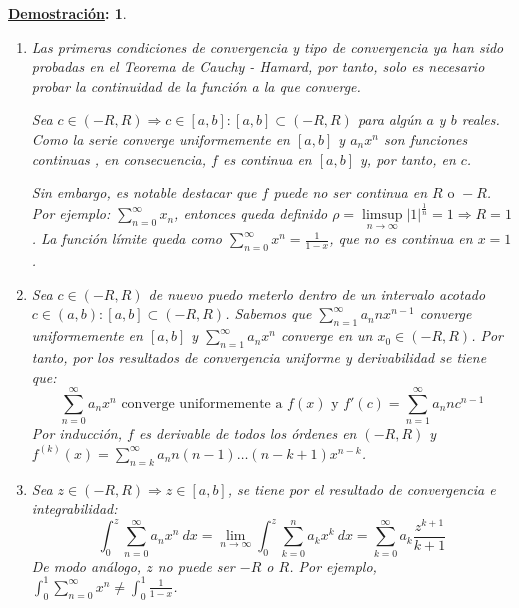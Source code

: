 \documentclass[10pt,a4paper,openright]{book}
\theoremstyle{break}
\newtheorem*{demo}{\underline{Demostración}:}
\newcommand{\dif}[1]{\ d#1}
\begin{document}
\begin{demo}
\begin{enumerate}
\item Las primeras condiciones de convergencia y tipo de convergencia ya han sido probadas en el Teorema de Cauchy - Hamard, por tanto, solo es necesario probar la continuidad de la función a la que converge.

Sea $c \in (-R, R)\Rightarrow c\in [a,b] : [a,b] \subset (-R, R)$ para algún $a$ y $b$ reales. Como la serie converge uniformemente en $[a,b]$ y $a_n x^n$  son funciones continuas , en consecuencia, $f$ es continua en $[a,b]$ y, por tanto, en $c$.

Sin embargo, es notable destacar que $f$ puede no ser continua en $R \mbox{ o } -R$. Por ejemplo: $\sum_{n=0}^{\infty} x_n$, entonces queda definido $\rho = \underset{n \to \infty}\limsup |1|^{\frac{1}{n}} = 1 \Rightarrow R=1$. La función límite queda como $\sum_{n=0}^{\infty} x^n= \frac{1}{1-x}$, que no es continua en $x=1$.

\item Sea $c \in (-R, R)$ de nuevo puedo meterlo dentro de un intervalo acotado $c \in (a,b) : [a,b] \subset (-R, R)$. Sabemos que $\sum_{n=1}^{\infty} a_n n x^{n-1}$ converge uniformemente en $[a,b]$ y $\sum_{n=1}^{\infty} a_n x^n$ converge en un $x_0 \in (-R, R)$. Por tanto, por los resultados de convergencia uniforme y derivabilidad se tiene que:
$$\sum_{n=0}^{\infty} a_n x^n \mbox{ converge uniformemente a } f(x) \mbox{ y } f'(c) = \sum_{n=1}^{\infty} a_n n c^{n-1}$$
Por inducción, $f$ es derivable de todos los órdenes en $(-R, R)$ y $f^{(k)}(x) = \sum_{n = k}^{\infty} a_n n (n-1) \ldots (n- k + 1) x^{n-k}$.

\item Sea $z\in (-R,R)\Rightarrow z\in [a,b]$, se tiene por el resultado de convergencia e integrabilidad:
$$\int_{0}^{z} \sum_{n=0}^{\infty} a_n x^n \dif{x} = \lim_{n \to \infty} \int_{0}^{z} \sum_{k=0}^{n} a_k x^k \dif{x} = \sum_{k=0}^{\infty} a_k \frac{z^{k+1}}{k+1}$$
De modo análogo, $z$ no puede ser $-R$ o $R$. Por ejemplo, $\int_{0}^{1} \sum_{n=0}^{\infty} x^n \neq \int_{0}^{1} \frac{1}{1-x}$.
\end{enumerate}
\end{demo}
\end{document}
